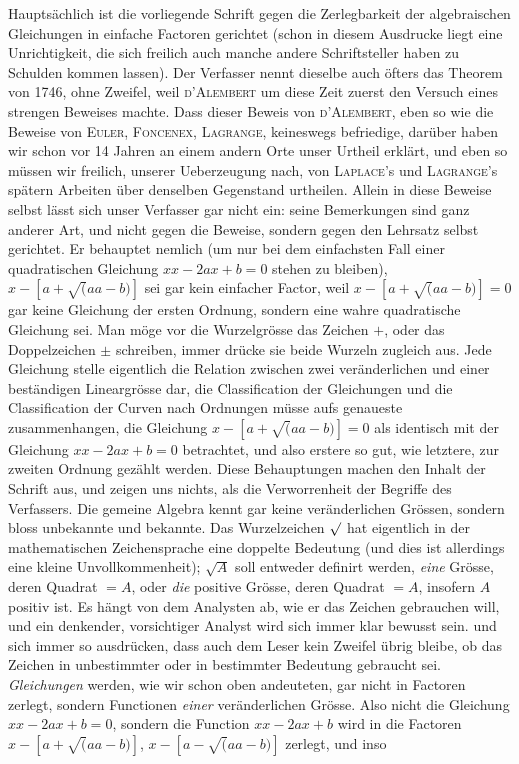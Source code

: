 Hauptsächlich ist die vorliegende Schrift gegen die Zerlegbarkeit der algebraischen Gleichungen in einfache Factoren gerichtet (schon in diesem Ausdrucke liegt eine Unrichtigkeit, die sich freilich auch manche andere Schriftsteller haben
zu Schulden kommen lassen). Der Verfasser nennt dieselbe auch öfters das Theorem von 1746, ohne Zweifel, weil \textsc{d’Alembert} um diese Zeit zuerst den Versuch eines strengen Beweises machte. Dass dieser Beweis von \textsc{d’Alembert}, eben so wie die Beweise von \textsc{Euler}, \textsc{Foncenex}, \textsc{Lagrange}, keineswegs befriedige, darüber haben wir schon vor 14 Jahren an einem andern Orte unser Urtheil erklärt, und eben so müssen wir freilich, unserer Ueberzeugung nach, von \textsc{Laplace}’s und \textsc{Lagrange}’s spätern Arbeiten über denselben Gegenstand urtheilen. Allein in diese Beweise selbst lässt sich unser Verfasser gar nicht ein: seine Bemerkungen sind ganz anderer Art, und nicht gegen die Beweise, sondern gegen den Lehrsatz selbst gerichtet. Er behauptet nemlich (um nur bei dem einfachsten Fall einer quadratischen Gleichung $xx-2ax+b=0$ stehen zu bleiben), $x-[a+\surd(aa-b)]$ sei gar kein einfacher Factor, weil $x-[a+\surd(aa-b)]=0$ gar keine Gleichung der ersten Ordnung, sondern eine wahre quadratische Gleichung sei. Man möge vor die Wurzelgrösse das Zeichen $+$, oder das Doppelzeichen $\pm$ schreiben, immer drücke sie beide Wurzeln zugleich aus. Jede Gleichung stelle eigentlich die Relation zwischen zwei veränderlichen und einer beständigen Lineargrösse dar, die Classification der Gleichungen und die Classification der Curven nach Ordnungen müsse aufs genaueste zusammenhangen, die Gleichung $x-[a+\surd(aa-b)]=0$ als identisch mit der Gleichung $xx-2ax+b=0$ betrachtet, und also erstere so gut, wie letztere, zur zweiten Ordnung gezählt werden. Diese Behauptungen machen den Inhalt der Schrift aus, und zeigen uns nichts, als die Verworrenheit der Begriffe des Verfassers. Die gemeine Algebra kennt gar keine veränderlichen Grössen, sondern bloss unbekannte und bekannte. Das Wurzelzeichen $\surd$ hat eigentlich in der mathematischen Zeichensprache eine doppelte Bedeutung (und dies ist allerdings eine kleine Unvollkommenheit); $\surd A$ soll entweder definirt werden, \textit{eine} Grösse, deren Quadrat $=A$, oder \textit{die} positive Grösse, deren Quadrat $=A$, insofern $A$ positiv ist. Es hängt von dem Analysten ab, wie er das Zeichen gebrauchen will, und ein denkender, vorsichtiger Analyst wird sich immer klar bewusst sein. und sich immer so ausdrücken, dass auch dem Leser kein Zweifel übrig bleibe, ob das Zeichen in unbestimmter oder in bestimmter Bedeutung gebraucht sei. \textit{Gleichungen} werden, wie wir schon oben andeuteten, gar nicht in Factoren zerlegt, sondern Functionen \textit{einer} veränderlichen Grösse. Also nicht die Gleichung $xx-2ax+b=0$, sondern die Function $xx-2ax+b$ wird in die Factoren $x-[a+\surd(aa-b)]$, $x-[a-\surd(aa-b)]$ zerlegt, und inso%
